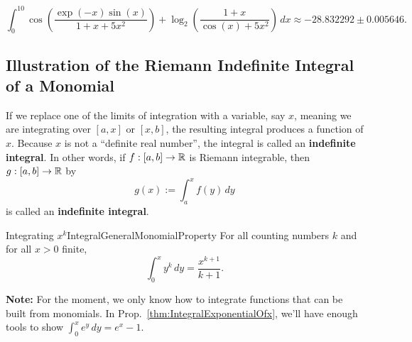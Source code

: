 \begin{equation}
\label{eq:ComplicatedFunction}
\int_{0}^{10} \cos\left(\frac{{\exp(-x)\sin(x)}}{{1 + x + 5x^{2}}}\right) + \log_{2}\left(\frac{{1 + x}}{{\cos(x) + 5x^{2}}}\right)\, dx
\approx  -28.832292 \pm  0.005646.
\end{equation}

\bigskip


\subsection{Illustration of the Riemann Indefinite Integral of a Monomial}
\label{sec:integratingMonomials}

If we replace one of the limits of integration with a variable, say $x$, meaning we are integrating over $[a, x]$ or $[x, b]$, the resulting integral produces a function of $x$. Because $x$ is not a ``definite real number'', the integral is called an \textbf{indefinite integral}.  In other words, if $f:[a, b]\to \mathbb R$ is Riemann integrable, then $g:[a, b]\to \mathbb R$ by
$$ g(x):=\int_{a}^{x} f(y) \, dy$$
is called an \textbf{indefinite integral}. 


\begin{propColor}{Integrating $x^k$}{IntegralGeneralMonomialProperty}
For all counting numbers $k$ and for all $x>0$ finite, 
\begin{equation}
    \int_0^x y^k \, dy = \frac{x^{k+1}}{k+1}.
\end{equation} 
\bigskip

\textbf{Note:} For the moment, we only know how to integrate functions that can be built from monomials. In Prop.~\ref{thm:IntegralExponentialOfx}, we'll have enough tools to show $ \int_0^x e^y \, dy = e^x - 1$.

\end{propColor}

